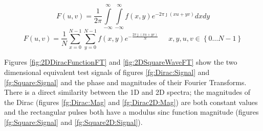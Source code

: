 \begin{equation}\label{eq:2dFT}
F(u,v) = \frac{1}{2\pi}\int\limits_{-\infty}^{\infty}\int\limits_{-\infty}^{\infty}f(x,y)e^{-2\pi\jmath (xu+yv)}dxdy
\end{equation}
\begin{equation}\label{eq:2dDFT}
F(u,v) = \frac{1}{N} \sum\limits_{x=0}^{N-1}\sum\limits_{y=0}^{N-1}f(x,y)e^{-\frac{2\pi\jmath (xu+yv)}{N}} \; \; \; \; \; x,y,u,v \in \left\lbrace 0\dots N-1\right\rbrace
\end{equation}

Figures \ref{fig:2DDiracFunctionFT} and \ref{fig:2DSquareWaveFT} show the two dimensional equivalent test signals of figures \ref{fg:Dirac:Signal} and \ref{fg:Square:Signal} and the phase and magnitudes of their Fourier Transforms. There is a direct similarity between the 1D and 2D spectra; the magnitudes of the Dirac (figures \ref{fg:Dirac:Mag} and \ref{fg:Dirac2D:Mag}) are both constant values and the rectangular pulses both have a modulus sinc function magnitude (figures \ref{fg:Square:Signal} and \ref{fg:Square2D:Signal}). 


